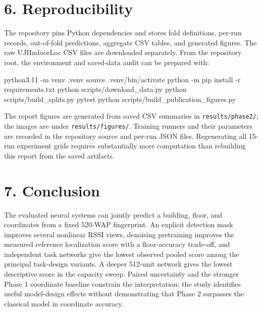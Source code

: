 \documentclass[
  10pt,
  a4paper,
]{article}
\newenvironment{Shaded}{}{}
\newcommand{\AttributeTok}[1]{\textcolor[rgb]{0.49,0.56,0.16}{#1}}
\newcommand{\BuiltInTok}[1]{\textcolor[rgb]{0.00,0.50,0.00}{#1}}
\newcommand{\ExtensionTok}[1]{#1}
\newcommand{\NormalTok}[1]{#1}
\begin{document}
\section{6. Reproducibility}\label{reproducibility}

The repository pins Python dependencies and stores fold definitions,
per-run records, out-of-fold predictions, aggregate CSV tables, and
generated figures. The raw UJIIndoorLoc CSV files are downloaded
separately. From the repository root, the environment and saved-data
audit can be prepared with:

\begin{Shaded}
\begin{Highlighting}[]
\ExtensionTok{python3.11} \AttributeTok{{-}m}\NormalTok{ venv .venv}
\BuiltInTok{source}\NormalTok{ .venv/bin/activate}
\ExtensionTok{python} \AttributeTok{{-}m}\NormalTok{ pip install }\AttributeTok{{-}r}\NormalTok{ requirements.txt}
\ExtensionTok{python}\NormalTok{ scripts/download\_data.py}
\ExtensionTok{python}\NormalTok{ scripts/build\_splits.py}
\ExtensionTok{pytest}
\ExtensionTok{python}\NormalTok{ scripts/build\_publication\_figures.py}
\end{Highlighting}
\end{Shaded}

The report figures are generated from saved CSV summaries in
\texttt{results/phase2/}; the images are under
\texttt{results/figures/}. Training runners and their parameters are
recorded in the repository source and per-run JSON files. Regenerating
all 15-run experiment grids requires substantially more computation than
rebuilding this report from the saved artifacts.

\section{7. Conclusion}\label{conclusion}

The evaluated neural systems can jointly predict a building, floor, and
coordinates from a fixed 520-WAP fingerprint. An explicit detection mask
improves several nonlinear RSSI views, denoising pretraining improves
the measured reference localization score with a floor-accuracy
trade-off, and independent task networks give the lowest observed pooled
score among the principal task-design variants. A deeper 512-unit
network gives the lowest descriptive score in the capacity sweep. Paired
uncertainty and the stronger Phase 1 coordinate baseline constrain the
interpretation: the study identifies useful model-design effects without
demonstrating that Phase 2 surpasses the classical model in coordinate
accuracy.
\end{document}
